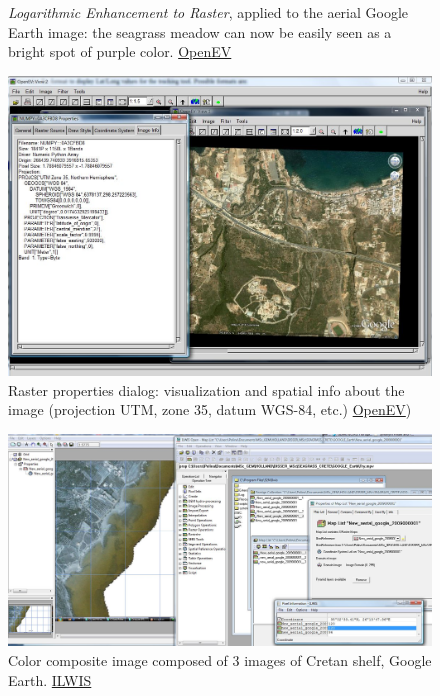\documentclass[10pt, a4paper]{article}
\begin{document}
\begin{appendices}
\begin{figure}[H]
\begin{center}
	\caption{\textit{Logarithmic Enhancement to Raster}, applied to the aerial Google Earth image: the seagrass meadow can now be easily seen as a bright spot of purple color. \href{http://openev.sourceforge.net/}{OpenEV}}\label{fig:A.40}	
	\end{center}	
\end{figure}
\begin{figure}[H]
	\begin{center}
		\includegraphics[scale=0.25]{OpenEV-1.jpg}
		\caption{Raster properties dialog: visualization and spatial info about the image (projection UTM, zone 35, datum WGS-84, etc.)  \href{http://openev.sourceforge.net/}{OpenEV})}\label{fig:A.41}	
	\end{center}	
\end{figure}
\begin{figure}[H]
	\begin{center}
		\includegraphics[scale=0.25]{Ilwis-2.jpg}
		\caption{Color composite image composed of 3 images of Cretan shelf, Google Earth. \href{http://www.ilwis.org/}{ILWIS}}\label{fig:A.42}	
	\end{center}	
\end{figure}
\pagebreak


\end{appendices}
\end{document}
